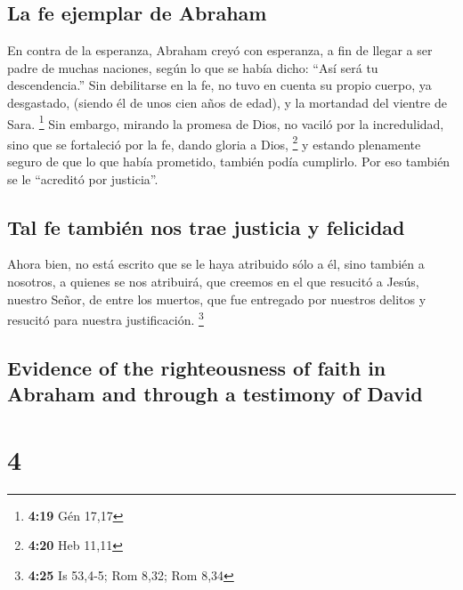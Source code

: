 \begin{paracol}{2}
\hypertarget{la-fe-ejemplar-de-abraham}{%
\subsection{La fe ejemplar de Abraham}\label{la-fe-ejemplar-de-abraham}}

 En contra de la esperanza, Abraham creyó con esperanza,
a fin de llegar a ser padre de muchas naciones, según lo que se había
dicho: ``Así será tu descendencia.''  Sin debilitarse en
la fe, no tuvo en cuenta su propio cuerpo, ya desgastado, (siendo él de
unos cien años de edad), y la mortandad del vientre de Sara. \footnote{\textbf{4:19}
  Gén 17,17}  Sin embargo, mirando la promesa de Dios, no
vaciló por la incredulidad, sino que se fortaleció por la fe, dando
gloria a Dios, \footnote{\textbf{4:20} Heb 11,11}  y
estando plenamente seguro de que lo que había prometido, también podía
cumplirlo.  Por eso también se le ``acreditó por
justicia''.

\hypertarget{tal-fe-tambiuxe9n-nos-trae-justicia-y-felicidad}{%
\subsection{Tal fe también nos trae justicia y
felicidad}\label{tal-fe-tambiuxe9n-nos-trae-justicia-y-felicidad}}

 Ahora bien, no está escrito que se le haya atribuido
sólo a él,  sino también a nosotros, a quienes se nos
atribuirá, que creemos en el que resucitó a Jesús, nuestro Señor, de
entre los muertos,  que fue entregado por nuestros
delitos y resucitó para nuestra justificación. \footnote{\textbf{4:25}
  Is 53,4-5; Rom 8,32; Rom 8,34}

\switchcolumn
\begin{otherlanguage}{english}

\hypertarget{evidence-of-the-righteousness-of-faith-in-abraham-and-through-a-testimony-of-david}{%
\subsection{Evidence of the righteousness of faith in Abraham and
through a testimony of
David}\label{evidence-of-the-righteousness-of-faith-in-abraham-and-through-a-testimony-of-david}}

\hypertarget{section-7}{%
\section{4}\label{section-7}}


\end{otherlanguage}
\end{paracol}
